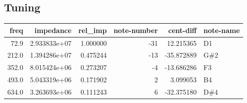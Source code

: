 \documentclass{article}
\begin{document}
\subsection{Tuning}
\begin{centering}
\begin{tabular}{rrrrrl}
\toprule
 freq &    impedance &  rel\_imp &  note-number &  cent-diff & note-name \\
\midrule
 72.9 & 2.933833e+07 & 1.000000 &          -31 &  12.215365 &        D1 \\
212.0 & 1.394286e+07 & 0.475244 &          -13 & -35.872889 &       G\#2 \\
352.0 & 8.015424e+06 & 0.273207 &           -4 & -13.686286 &        F3 \\
493.0 & 5.043319e+06 & 0.171902 &            2 &   3.099053 &        B4 \\
634.0 & 3.263693e+06 & 0.111243 &            6 & -32.375180 &       D\#4 \\
\bottomrule
\end{tabular}
\end{centering}
\end{document}
